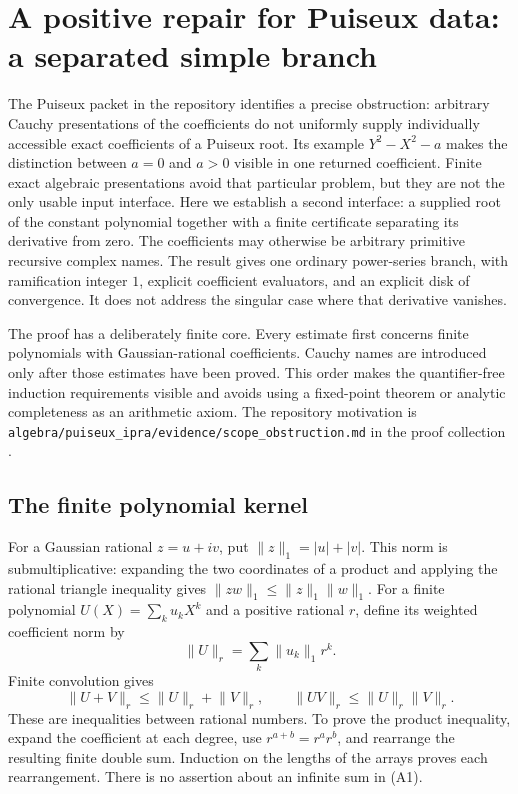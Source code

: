 \section{A positive repair for Puiseux data: a separated simple branch}
\label{sec:simplebranch}

The Puiseux packet in the repository identifies a precise obstruction:
arbitrary Cauchy presentations of the coefficients do not uniformly supply
individually accessible exact coefficients of a Puiseux root. Its example
\(Y^2-X^2-a\) makes the distinction between \(a=0\) and \(a>0\) visible in
one returned coefficient. Finite exact algebraic presentations avoid that
particular problem, but they are not the only usable input interface.
Here we establish a second interface: a supplied root of the constant
polynomial together with a finite certificate separating its derivative
from zero. The coefficients may otherwise be arbitrary primitive
recursive complex names. The result gives one ordinary power-series
branch, with ramification integer \(1\), explicit coefficient evaluators,
and an explicit disk of convergence. It does not address the singular
case where that derivative vanishes.

The proof has a deliberately finite core. Every estimate first concerns
finite polynomials with Gaussian-rational coefficients. Cauchy names are
introduced only after those estimates have been proved. This order makes
the quantifier-free induction requirements visible and avoids using a
fixed-point theorem or analytic completeness as an arithmetic axiom.
The repository motivation is
\texttt{algebra/puiseux\_ipra/evidence/scope\_obstruction.md} in the
proof collection \cite{ProveIt}.

\subsection{The finite polynomial kernel}

For a Gaussian rational \(z=u+iv\), put
\(\lVert z\rVert_1=|u|+|v|\). This norm is submultiplicative:
expanding the two coordinates of a product and applying the rational
triangle inequality gives
\(\lVert zw\rVert_1\leq\lVert z\rVert_1\lVert w\rVert_1\).
For a finite polynomial \(U(X)=\sum_k u_kX^k\) and a positive rational
\(r\), define its weighted coefficient norm by
\[
  \lVert U\rVert_r=\sum_k\lVert u_k\rVert_1r^k.
\]
Finite convolution gives
\[
 \lVert U+V\rVert_r\leq\lVert U\rVert_r+\lVert V\rVert_r,
 \qquad
 \lVert UV\rVert_r\leq\lVert U\rVert_r\lVert V\rVert_r.
 \tag{A1}\label{eq:branch-norm}
\]
These are inequalities between rational numbers. To prove the product
inequality, expand the coefficient at each degree, use
\(r^{a+b}=r^ar^b\), and rearrange the resulting finite double sum.
Induction on the lengths of the arrays proves each rearrangement.
There is no assertion about an infinite sum in (A1).

